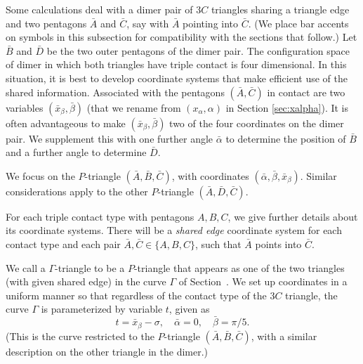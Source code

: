 Some calculations deal with a dimer pair of $3C$ triangles sharing a
triangle edge and two pentagons $\bar{A}$ and $\bar{C}$, say with
$\bar{A}$ pointing into $\bar{C}$.  (We place bar accents on symbols
in this subsection for compatibility with the sections that follow.)
Let $\bar{B}$ and $\bar{D}$ be the two outer pentagons of the dimer
pair.  The configuration space of dimer in which both triangles have
triple contact is four dimensional.  In this situation, it is best to
develop coordinate systems that make efficient use of the shared
information.  Associated with the pentagons $(\bar{A},\bar{C})$ in
contact are two variables $(\bar x_\beta,\bar\beta)$ (that we rename
from $(x_\alpha,\alpha)$ in Section \ref{sec:xalpha}).  It is often
advantageous to make $(\bar x_\beta,\bar\beta)$ two of the four
coordinates on the dimer pair.  We supplement this with one further
angle $\bar\alpha$ to determine the position of $\bar B$ and a further
angle to determine $\bar D$.

We focus on the $P$-triangle $(\bar A,\bar B,\bar C)$, with
coordinates $(\bar\alpha,\bar\beta,\bar x_\beta)$.  Similar
considerations apply to the other $P$-triangle $(\bar A,\bar D,\bar
C)$.

For each triple contact type with pentagons $A,B,C$, we give further
details about its coordinate systems.  There will be a {\it shared
  edge} coordinate system for each contact type and each pair $\bar
A,\bar C\in \{A,B,C\}$, such that $\bar A$ points into $\bar C$.

We call a $\Gamma$-triangle to be a $P$-triangle that appears as one
of the two triangles (with given shared edge) in the curve $\Gamma$ of
Section~.  We set up coordinates in a uniform manner so
that regardless of the contact type of the $3C$ triangle, the curve
$\Gamma$ is parameterized by variable $t$, given as
\[
t = \bar x_\beta  -\sigma, \quad
\bar\alpha = 0,\quad
\bar\beta = \pi/5.
\]
  (This is the curve
restricted to the $P$-triangle $(\bar A,\bar B,\bar C)$, with a
similar description on the other triangle in the dimer.)


